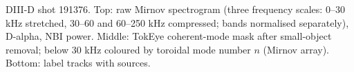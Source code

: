\caption{DIII-D shot 191376. Top: raw Mirnov spectrogram (three frequency scales: 0--30 kHz stretched, 30--60 and 60--250 kHz compressed; bands normalised separately), D-alpha, NBI power. Middle: TokEye coherent-mode mask after small-object removal; below 30 kHz coloured by toroidal mode number $n$ (Mirnov array). Bottom: label tracks with sources.}
\label{fig:interpreter-191376}
